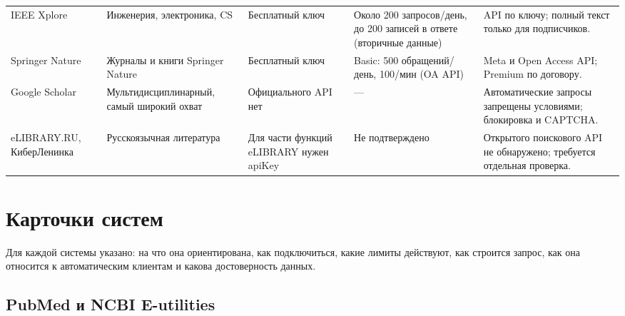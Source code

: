 \documentclass[11pt,a4paper]{article}
\begin{document}
\begin{landscape}
\begin{longtable}{>{\raggedright\arraybackslash}p{2.7cm}>{\raggedright\arraybackslash}p{3.4cm}>{\raggedright\arraybackslash}p{3.0cm}>{\raggedright\arraybackslash}p{6.2cm}>{\raggedright\arraybackslash}p{7.6cm}}
IEEE Xplore & Инженерия, электроника, CS & Бесплатный ключ & Около 200 запросов/день, до 200 записей в ответе (вторичные данные) & API по ключу; полный текст только для подписчиков.\\
Springer Nature & Журналы и книги Springer Nature & Бесплатный ключ & Basic: 500 обращений/день, 100/мин (OA API) & Meta и Open Access API; Premium по договору.\\
Google Scholar & Мульти\-дисци\-плинар\-ный, самый широкий охват & Официального API нет & --- & Автоматические запросы запрещены условиями; блокировка и CAPTCHA.\\
eLIBRARY.RU, КиберЛенинка & Русскоязычная литература & Для части функций eLIBRARY нужен apiKey & Не подтверждено & Открытого поискового API не обнаружено; требуется отдельная проверка.\\
\bottomrule
\end{longtable}
\end{landscape}
\pagestyle{fancy}

\section{Карточки систем}

Для каждой системы указано: на что она ориентирована, как подключиться, какие лимиты действуют, как строится запрос, как она относится к автоматическим клиентам и какова достоверность данных.

\subsection{PubMed и NCBI E-utilities}
\end{document}
